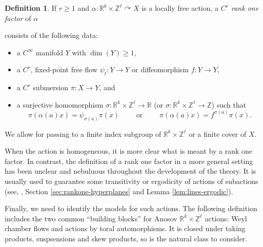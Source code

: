 \documentclass[12pt]{amsart}
\theoremstyle{definition}
\newtheorem{definition}[theorem]{Definition}
\theoremstyle{remark}
\numberwithin{equation}{section}
\newcommand{\Z}{\mathbb{Z}}
\newcommand{\R}{\mathbb{R}}
\newtheorem{Structural Stability Theorem}[theorem]{Structural Stability Theorem}
\begin{document}
\begin{definition}
If {  $r \ge 1$ and} $\alpha : \R^k \times \Z^\ell \curvearrowright X$ is a locally free action, a {\it $C^r$ rank one factor} of $\alpha$ { consists of the following data:

\begin{itemize}
\item  a $C^\infty$ manifold $Y$ with $\dim(Y) \ge 1$,
\item a $C^r$, fixed-point free flow $\psi_t : Y \to Y$ or diffeomorphism $f : Y \to Y$,
\item  a $C^r$ submersion $\pi : X \to Y$, and
\item a surjective homomorphism $\sigma : \R^k \times \Z^\ell \to \R$ (or $\sigma : \R^k \times \Z^\ell \to \Z$) such that
\[ \pi(\alpha(a)x) = \psi_{\sigma(a)}\pi(x) \qquad \mbox{   or   }\qquad \pi(\alpha(a)x) = f^{\sigma(a)}\pi(x).\]
\end{itemize}
}

We allow for passing to a finite index subgroup of $\R^k \times \Z^\ell$ or a finite cover of $X$. 
\end{definition}

When the action is homogeneous, it is more clear what is meant by a rank one factor. In contrast, the definition of a rank one factor in a more general setting has been unclear and nebuluous throughout the development of the theory. It is usually used to guarantee some transitivity or ergodicity of actions of subactions (see, \cite[Theorem 2.1]{spatzier-vinhage}, Section \ref{sec:rankone-hyperplanes} and Lemma \ref{lem:lines-ergodic}).

Finally, we need to identify the models for such actions. The following definition includes the two common ``building blocks'' for Anosov $\R^k \times \Z^\ell$ actions: Weyl chamber flows and actions by toral automorphisms. It is closed under taking products, suspsensions and skew products, so is the natural class to consider.
\end{document}
